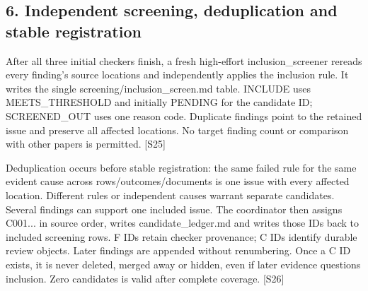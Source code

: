 \documentclass[10pt,a4paper]{article}
\begin{document}
\subsection*{6.\allowbreak{} Independent screening, deduplication and stable registration}
After all three initial checkers finish, a fresh high-\allowbreak{}effort inclusion\_\allowbreak{}screener rereads every finding's source locations and independently applies the inclusion rule.\allowbreak{} It writes the single screening/\allowbreak{}inclusion\_\allowbreak{}screen.\allowbreak{}md table.\allowbreak{} INCLUDE uses MEETS\_\allowbreak{}THRESHOLD and initially PENDING for the candidate ID; SCREENED\_\allowbreak{}OUT uses one reason code.\allowbreak{} Duplicate findings point to the retained issue and preserve all affected locations.\allowbreak{} No target finding count or comparison with other papers is permitted.\allowbreak{} [S25]\par
Deduplication occurs before stable registration: the same failed rule for the same evident cause across rows/\allowbreak{}outcomes/\allowbreak{}documents is one issue with every affected location.\allowbreak{} Different rules or independent causes warrant separate candidates.\allowbreak{} Several findings can support one included issue.\allowbreak{} The coordinator then assigns C001.\allowbreak{}.\allowbreak{}.\allowbreak{} in source order, writes candidate\_\allowbreak{}ledger.\allowbreak{}md and writes those IDs back to included screening rows.\allowbreak{} F IDs retain checker provenance; C IDs identify durable review objects.\allowbreak{} Later findings are appended without renumbering.\allowbreak{} Once a C ID exists, it is never deleted, merged away or hidden, even if later evidence questions inclusion.\allowbreak{} Zero candidates is valid after complete coverage.\allowbreak{} [S26]\par
\end{document}

